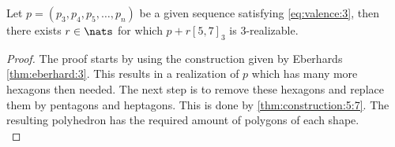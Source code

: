 \begin{corollary}
  Let $p = (p_3, p_4, p_5, \dots, p_n)$ be a given sequence satisfying \autoref{eq:valence:3}, then there exists $r \in \nats$ for which $p + r [5, 7]_3$ is $3$-realizable.
  \begin{proof}
    The proof starts by using the construction given by Eberhards \autoref{thm:eberhard:3}. This results in a realization of $p$ which has many more hexagons then needed. The next step is to remove these hexagons and replace them by pentagons and heptagons. This is done by \autoref{thm:construction:5:7}. The resulting polyhedron has the required amount of polygons of each shape.\\
  \end{proof}
\end{corollary}





